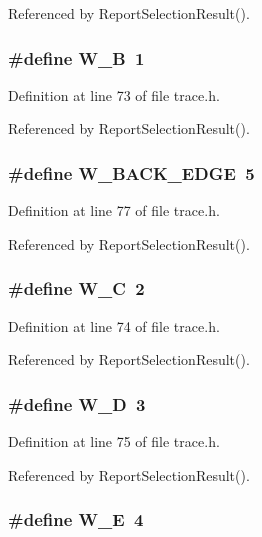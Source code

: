 Referenced by Report\-Selection\-Result().
\subsubsection{\setlength{\rightskip}{0pt plus 5cm}\#define W\_\-B~1}\label{trace_8h_18913ecea676759520340edc88e410a0}




Definition at line 73 of file trace.h.

Referenced by Report\-Selection\-Result().
\subsubsection{\setlength{\rightskip}{0pt plus 5cm}\#define W\_\-BACK\_\-EDGE~5}\label{trace_8h_41ac42822601b3edb9b1d50ccfc10042}




Definition at line 77 of file trace.h.

Referenced by Report\-Selection\-Result().
\subsubsection{\setlength{\rightskip}{0pt plus 5cm}\#define W\_\-C~2}\label{trace_8h_8ef13ae4fac2a6bd9df898517e086c2f}




Definition at line 74 of file trace.h.

Referenced by Report\-Selection\-Result().
\subsubsection{\setlength{\rightskip}{0pt plus 5cm}\#define W\_\-D~3}\label{trace_8h_ffc839f322c85035b1ffb99a47637d1a}




Definition at line 75 of file trace.h.

Referenced by Report\-Selection\-Result().
\subsubsection{\setlength{\rightskip}{0pt plus 5cm}\#define W\_\-E~4}\label{trace_8h_dabf30db524e1a92a733ce507a564c9f}




